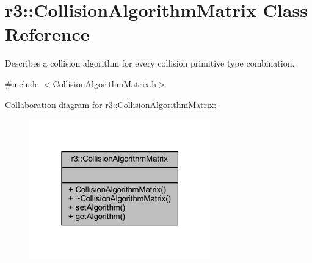 \hypertarget{classr3_1_1_collision_algorithm_matrix}{}\section{r3\+:\+:Collision\+Algorithm\+Matrix Class Reference}
\label{classr3_1_1_collision_algorithm_matrix}


Describes a collision algorithm for every collision primitive type combination.  




{\ttfamily \#include $<$Collision\+Algorithm\+Matrix.\+h$>$}



Collaboration diagram for r3\+:\+:Collision\+Algorithm\+Matrix\+:\nopagebreak
\begin{figure}[H]
\begin{center}
\leavevmode
\includegraphics[width=223pt]{classr3_1_1_collision_algorithm_matrix__coll__graph}
\end{center}
\end{figure}
